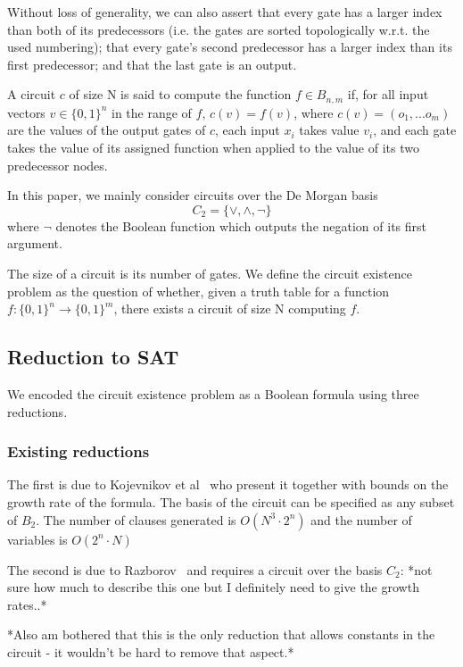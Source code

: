\documentclass{article}
\begin{document}
Without loss of generality, we can also assert that every gate has a larger index than both of its predecessors (i.e. the gates are sorted topologically w.r.t. the used numbering); that every gate's second predecessor has a larger index than its first predecessor; and that the last gate is an output.~\cite{kulikov}

A circuit \(c\) of size N is said to compute the function \(f\in B_{n,m}\) if, for all input vectors \(v\in\{0,1\}^n\) in the range of \(f\), \(c(v)=f(v)\), where \(c(v) = (o_1,...o_m)\) are the values of the output gates of \(c\), each input \(x_i\) takes value \(v_i\), and each gate takes the value of its assigned function when applied to the value of its two predecessor nodes.

In this paper, we mainly consider circuits over the De Morgan basis \[C_2 = \{\lor, \land, \neg\}\] where \(\neg\) denotes the Boolean function which outputs the negation of its first argument.

The size of a circuit is its number of gates. We define the circuit existence problem as the question of whether, given a truth table for a function \(f: \{0,1\}^n \to \{0,1\}^m\), there exists a circuit of size N computing \(f\).

\subsection{Reduction to SAT}

We encoded the circuit existence problem as a Boolean formula using three reductions.

\subsubsection{Existing reductions}

The first is due to Kojevnikov et al~\cite{kulikov} who present it together with bounds on the growth rate of the formula. The basis of the circuit can be specified as any subset of \(B_2\). The number of clauses generated is \(O(N^3\cdot2^n)\) and the number of variables is \(O(2^n\cdot N)\)

The second is due to Razborov~\cite{raz} and requires a circuit over the basis \(C_2\): *not sure how much to describe this one but I definitely need to give the growth rates..*

*Also am bothered that this is the only reduction that allows constants in the circuit - it wouldn't be hard to remove that aspect.*
\end{document}
